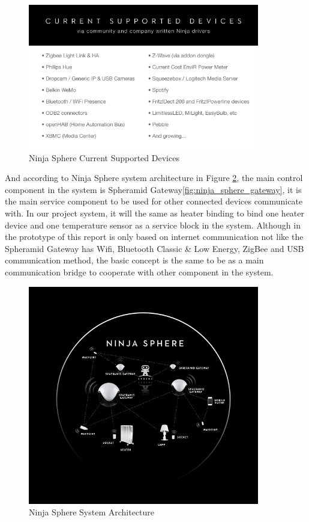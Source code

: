 \begin{figure}
	\centering    	
\includegraphics[width=0.90\textwidth,natwidth=610,natheight=642]{figs/ninja_sphere_conect_devices.png}
  	\caption{Ninja Sphere Current Supported Devices}
  	\label{fig:ninja_sphere_conect_devices}
\end{figure}

\par And according to Ninja Sphere system architecture in Figure \ref{fig:ninja_sphere_system}, the main control component in the system is Spheramid Gateway\ref{fig:ninja_sphere_gateway}, it is the main service component to be used for other connected devices communicate with. In our project system, it will the same as heater binding to bind one heater device and one temperature sensor as a service block in the system. Although in the prototype of this report is only based on internet communication not like the Spheramid Gateway has Wifi, Bluetooth Classic \& Low Energy, ZigBee and USB communication method, the basic concept is the same to be as a main communication bridge to cooperate with other component in the system.

\begin{figure}
	\centering    	
\includegraphics[width=0.90\textwidth,natwidth=610,natheight=642]{figs/ninja_sphere_system.png}
  	\caption{Ninja Sphere System Architecture}
  	\label{fig:ninja_sphere_system}
\end{figure}

